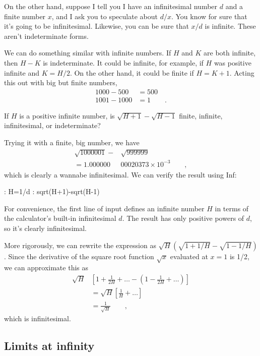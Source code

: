 On the other hand, suppose I tell you I have an infinitesimal number $d$ and a
finite number $x$, and I ask you to speculate about $d/x$. You know for sure
that it's going to be infinitesimal. Likewise, you can be sure that $x/d$ is
infinite. These aren't indeterminate forms.

We can do something similar with infinite numbers. If $H$ and $K$ are both
infinite, then $H-K$ is indeterminate. It could be infinite, for example, if
$H$ was positive infinite and $K=H/2$. On the other hand, it could be finite
if $H=K+1$. Acting this out with big but finite numbers,
\begin{align*}
  1000-500 &= 500 \\
  1001-1000 &= 1 \qquad .
\end{align*}

\begin{eg}
\egquestion If $H$ is a positive infinite number, is $\sqrt{H+1}-\sqrt{H-1}$
finite, infinite, infinitesimal, or indeterminate?

\eganswer Trying it with a finite, big number, we have
\begin{align*}
  \sqrt{1000001}-&\sqrt{999999} \\
    = 1.000000&00020373\times 10^{-3} \qquad ,
\end{align*}
which is clearly a wannabe infinitesimal.
We can verify the result using Inf:
\begin{Code}
  \ii : H=1/d
  \ii : sqrt(H+1)-sqrt(H-1)
\end{Code}
For convenience, the first line of input defines an infinite number $H$ in terms of the calculator's
built-in infinitesimal $d$. The result has only positive powers of $d$, so it's clearly infinitesimal.

More rigorously, we can rewrite
the expression as $\sqrt{H}(\sqrt{1+1/H}-\sqrt{1-1/H})$. Since the derivative
of the square root function $\sqrt{x}$ evaluated at $x=1$ is 1/2, we can
approximate this as
\begin{align*}
  \sqrt{H}&\left[1+\frac{1}{2H}+\ldots-\left(1-\frac{1}{2H}+\ldots\right)\right] \\
    &= \sqrt{H}\left[\frac{1}{H}+\ldots\right] \\
    &= \frac{1}{\sqrt{H}} \qquad ,
\end{align*}
which is infinitesimal.
\end{eg}

\subsection{Limits at infinity}

